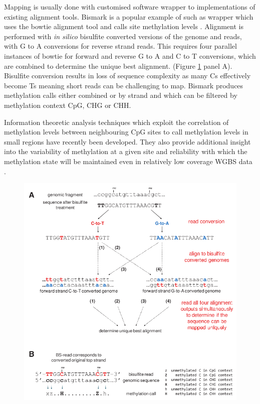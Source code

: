 \documentclass[
]{book}
\begin{document}
Mapping is usually done with customised software wrapper to implementations of existing alignment tools. Bismark is a popular example of such as wrapper which uses the bowtie alignment tool and calls site methylation levels \citep{Tran2014}. Alignment is performed with \emph{in silico} bisulfite converted versions of the genome and reads, with G to A conversions for reverse strand reads. This requires four parallel instances of bowtie for forward and reverse G to A and C to T conversions, which are combined to determine the unique best alignment. (Figure \ref{fig:Krueger2011BismarkAlignment} panel A). Bisulfite conversion results in loss of sequence complexity as many Cs effectively become Ts meaning short reads can be challenging to map. Bismark produces methylation calls either combined or by strand and which can be filtered by methylation context CpG, CHG or CHH.

Information theoretic analysis techniques which exploit the correlation of methylation levels between neighbouring CpG sites \citep[\citet{Affinito2016}]{Haerter2014} to call methylation levels in small regions have recently been developed. They also provide additional insight into the variability of methylation at a given site and reliability with which the methylation state will be maintained even in relatively low coverage WGBS data \citep{Jenkinson2018}.

\begin{figure}

{\centering \includegraphics[width=0.9\linewidth]{figs/Krueger2011BismarkAlignment} 

}

\caption{\citep{Krueger2011}}\label{fig:Krueger2011BismarkAlignment}
\end{figure}
\end{document}
